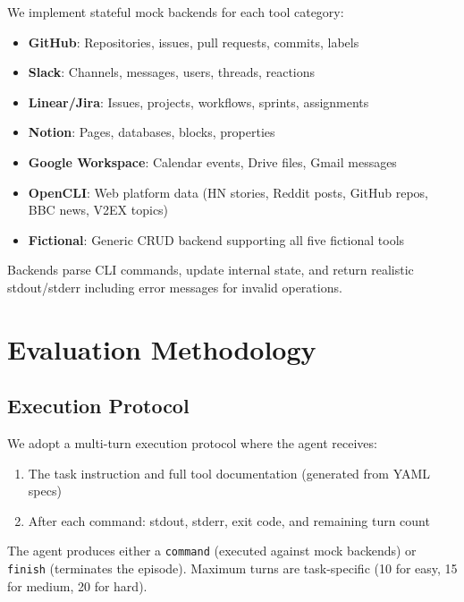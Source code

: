 \documentclass{article}
\begin{document}
We implement stateful mock backends for each tool category:

\begin{itemize}[leftmargin=*, itemsep=1pt]
    \item \textbf{GitHub}: Repositories, issues, pull requests, commits, labels
    \item \textbf{Slack}: Channels, messages, users, threads, reactions
    \item \textbf{Linear/Jira}: Issues, projects, workflows, sprints, assignments
    \item \textbf{Notion}: Pages, databases, blocks, properties
    \item \textbf{Google Workspace}: Calendar events, Drive files, Gmail messages
    \item \textbf{OpenCLI}: Web platform data (HN stories, Reddit posts, GitHub repos, BBC news, V2EX topics)
    \item \textbf{Fictional}: Generic CRUD backend supporting all five fictional tools
\end{itemize}

Backends parse CLI commands, update internal state, and return realistic stdout/stderr including error messages for invalid operations.

\section{Evaluation Methodology}
\label{sec:evaluation}

\subsection{Execution Protocol}

We adopt a multi-turn execution protocol where the agent receives:
\begin{enumerate}[leftmargin=*, itemsep=1pt]
    \item The task instruction and full tool documentation (generated from YAML specs)
    \item After each command: stdout, stderr, exit code, and remaining turn count
\end{enumerate}

The agent produces either a \texttt{command} (executed against mock backends) or \texttt{finish} (terminates the episode). Maximum turns are task-specific (10 for easy, 15 for medium, 20 for hard).
\end{document}
